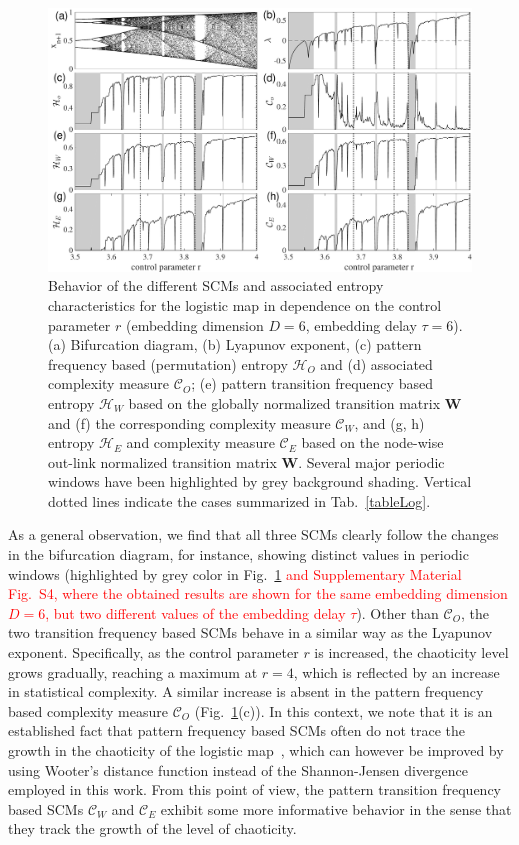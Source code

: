 \documentclass[aip,cha,reprint,nofootinbib]{revtex4-1}
\begin{document}
\begin{figure}
	\centering 
	\includegraphics[width=2\columnwidth]{logisticEntropy.pdf}
\caption{\small{Behavior of the different SCMs and associated entropy characteristics for the logistic map in dependence on the control parameter $r$ {\color{red}(embedding dimension $D = 6$, embedding delay $\tau=6$).} (a) Bifurcation diagram, (b) Lyapunov exponent, (c) pattern frequency based (permutation) entropy $\mathcal{H}_O$ and (d) associated complexity measure $\mathcal{C}_O$; (e) pattern transition frequency based entropy $\mathcal{H}_W$ based on the globally normalized transition matrix $\mathbf{W}$ and (f) the corresponding complexity measure $\mathcal{C}_W$, and (g, h) entropy $\mathcal{H}_E$ and complexity measure $\mathcal{C}_E$ based on the node-wise out-link normalized transition matrix $\mathbf{W}$. Several major periodic windows have been highlighted by grey background shading. Vertical dotted lines indicate the cases summarized in Tab.~\ref{tableLog}. } \label{fig:bifurcation}}
\end{figure}

As a general observation, we find that all three SCMs clearly follow the changes in the bifurcation diagram, for instance, showing distinct values in periodic windows (highlighted by grey color in Fig.~\ref{fig:bifurcation} \textcolor{red}{and Supplementary Material Fig.~S4, where the obtained results are shown for the same embedding dimension $D=6$, but two different values of the embedding delay $\tau$}). Other than $\mathcal{C}_O$, the two transition frequency based SCMs behave in a similar way as the Lyapunov exponent. Specifically, as the control parameter $r$ is increased, the chaoticity level grows gradually, reaching a maximum at $r = 4$, which is reflected by an increase in statistical complexity. A similar increase is absent in the pattern frequency based complexity measure $\mathcal{C}_O$ (Fig.~\ref{fig:bifurcation}(c)). In this context, we note that it is an established fact that pattern frequency based SCMs often do not trace the growth in the chaoticity of the logistic map~\cite{MartinPLA2003}, which can however be improved by using Wooter's distance function instead of the Shannon-Jensen divergence employed in this work. From this point of view, the pattern transition frequency based SCMs $\mathcal{C}_W$ and $\mathcal{C}_E$ exhibit some more informative behavior in the sense that they track the growth of the level of chaoticity. 
\end{document}
